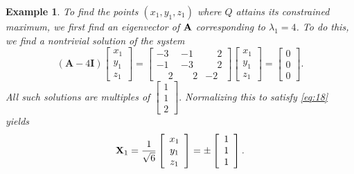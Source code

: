 \documentclass{article}
\newtheorem{example}{Example}
\begin{document}
\begin{example}
To find the points $(x_{1},y_{1},z_{1})$ where $Q$ attains its
constrained maximum, we first find an eigenvector of ${\bf A}$
corresponding
to $\lambda_{1}=4$. To do this, we find a nontrivial solution of the
system
$$
(\mathbf{A}-4\mathbf{I})
\left[\begin{array}{ccccccc}
 x_{1}\\ y_{1}\\ z_{1}
\end{array}\right]=
\left[\begin{array}{ccccccc}
 -3 & -1 & \phantom{-}2 \\
-1 & -3 & \phantom{-}2 \\
\phantom{-}2 & \phantom{-}2 & -2
\end{array}\right]
\left[\begin{array}{ccccccc}
x_{1}\\y_{1}\\z_{1}
\end{array}\right]=
\left[\begin{array}{ccccccc}
0\\0\\0
\end{array}\right].
$$
All such solutions are multiples of
$
\left[\begin{array}{ccccccc}
1\\1\\2
\end{array}\right].
$
Normalizing this  to satisfy \eqref{eq:18} yields
$$
{\bf X}_{1}=\frac{1}{\sqrt6}
\left[\begin{array}{ccccccc}
x_{1}\\y_{1}\\z_{1}
\end{array}\right]=\pm
\left[\begin{array}{ccccccc}
1\\ 1\\1
\end{array}\right].
$$


\end{example}
\end{document}
